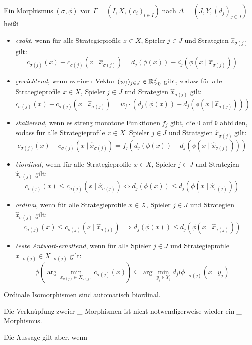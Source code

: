 \begin{defn}\label{def:PotentialMorphismen}
	Ein Morphismus $(\sigma, \phi)$ von $\Gamma = (I, X, (c_i)_{i\in I})$ nach $\Delta = (J, Y, (d_j)_{j\in J})$ heißt
	\begin{itemize}
		\item \emph{exakt}, wenn für alle Strategieprofile $x \in X$, Spieler $j \in J$ und Strategien $\hat{x}_{\sigma(j)}$ gilt:
		\[c_{\sigma(j)}(x) - c_{\sigma(j)}(x \mid \hat{x}_{\sigma(j)}) = d_j(\phi(x)) - d_j(\phi(x \mid \hat{x}_{\sigma(j)}))\]
		\item \emph{gewichtend}, wenn es einen Vektor $(w_j)_{j \in J} \in \mathbb{R}_{\geq 0}^J$ gibt, sodass für alle Strategieprofile $x \in X$, Spieler $j \in J$ und Strategien $\hat{x}_{\sigma(j)}$ gilt:
		\[c_{\sigma(j)}(x) - c_{\sigma(j)}(x \mid \hat{x}_{\sigma(j)}) = w_j\cdot\left(d_j(\phi(x)) - d_j(\phi(x \mid \hat{x}_{\sigma(j)}))\right)\]
		\item \emph{skalierend}, wenn es streng monotone Funktionen $f_j$ gibt, die $0$ auf $0$ abbilden, sodass für alle Strategieprofile $x \in X$, Spieler $j \in J$ und Strategien $\hat{x}_{\sigma(j)}$ gilt:
		\[c_{\sigma(j)}(x) - c_{\sigma(j)}(x \mid \hat{x}_{\sigma(j)}) = f_j(d_j(\phi(x)) - d_j(\phi(x \mid \hat{x}_{\sigma(j)})))\]
		\item \emph{biordinal}, wenn für alle Strategieprofile $x \in X$, Spieler $j \in J$ und Strategien $\hat{x}_{\sigma(j)}$ gilt:
		\[c_{\sigma(j)}(x) \leq c_{\sigma(j)}(x \mid \hat{x}_{\sigma(j)}) \iff d_j(\phi(x)) \leq d_j(\phi(x \mid \hat{x}_{\sigma(j)}))\]
		\item \emph{ordinal}, wenn für alle Strategieprofile $x \in X$, Spieler $j \in J$ und Strategien $\hat{x}_{\sigma(j)}$ gilt:
		\[c_{\sigma(j)}(x) \leq c_{\sigma(j)}(x \mid \hat{x}_{\sigma(j)}) \implies d_j(\phi(x)) \leq d_j(\phi(x \mid \hat{x}_{\sigma(j)}))\]
		\item \emph{beste Antwort-erhaltend}, wenn für alle Spieler $j \in J$ und Strategieprofile $x_{-\sigma(j)} \in X_{-\sigma(j)}$ gilt:
		\[\phi(\arg \min_{x_{\sigma(j)} \in X_{\sigma(j)}}c_{\sigma(j)}(x)) \subseteq \arg \min_{y_j \in Y_j} d_j(\phi_{-\sigma(j)}(x \mid y_j)\]
	\end{itemize}	
\end{defn}

\begin{beob}
	Ordinale Isomorphismen sind automatisch biordinal.
\end{beob}

\begin{beob}
	Die Verknüpfung zweier \_-Morphismen ist nicht notwendigerweise wieder ein \_-Morphismus. 
	
	
	Die Aussage gilt aber, wenn 
	
\end{beob}

